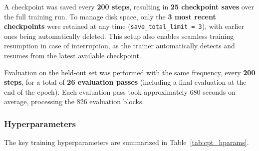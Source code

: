 \documentclass[12pt,a4paper]{report}
\begin{document}
A checkpoint was saved every \textbf{200 steps}, resulting in \textbf{25
checkpoint saves} over the full training run. To manage disk space, only the
\textbf{3 most recent checkpoints} were retained at any time
(\texttt{save\_total\_limit = 3}), with earlier ones being automatically
deleted. This setup also enables seamless training resumption in case of
interruption, as the trainer automatically detects and resumes from the latest
available checkpoint.

Evaluation on the held-out set was performed with the same frequency,
every \textbf{200 steps}, for a total of \textbf{26 evaluation passes}
(including a final evaluation at the end of the epoch). Each evaluation pass
took approximately 680 seconds on average, processing the 826 evaluation
blocks.

\subsubsection{Hyperparameters}

The key training hyperparameters are summarized in Table~\ref{tab:cpt_hparams}.
\end{document}
